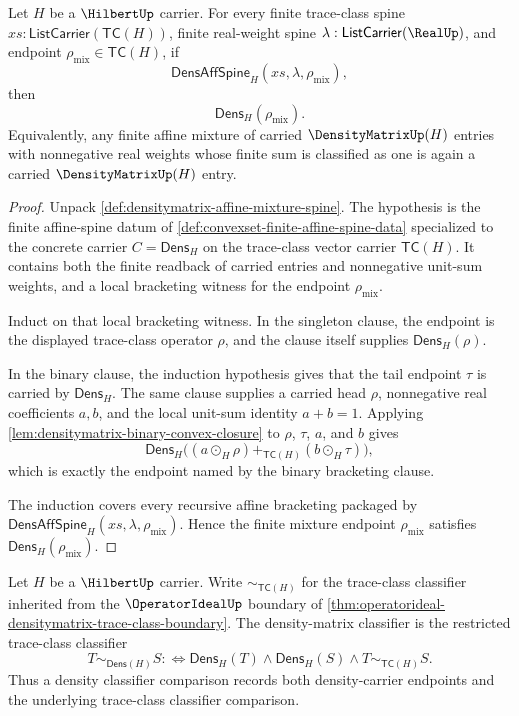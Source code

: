 \begin{theorem}
\label{thm:densitymatrix-finite-affine-mixture-closure}
Let $H$ be a $\HilbertUp$ carrier. For every finite trace-class spine $xs:\mathsf{ListCarrier}(\mathsf{TC}(H))$, finite real-weight spine $\lambda:\mathsf{ListCarrier}(\RealUp)$, and endpoint $\rho_{\mathrm{mix}}\in\mathsf{TC}(H)$, if
$$
\mathsf{DensAffSpine}_H(xs,\lambda,\rho_{\mathrm{mix}}),
$$
then
$$
\mathsf{Dens}_H(\rho_{\mathrm{mix}}).
$$
Equivalently, any finite affine mixture of carried $\DensityMatrixUp(H)$ entries with nonnegative real weights whose finite sum is classified as one is again a carried $\DensityMatrixUp(H)$ entry.
\end{theorem}
\begin{proof}
Unpack \autoref{def:densitymatrix-affine-mixture-spine}. The hypothesis is the finite affine-spine datum of \autoref{def:convexset-finite-affine-spine-data} specialized to the concrete carrier $C=\mathsf{Dens}_H$ on the trace-class vector carrier $\mathsf{TC}(H)$. It contains both the finite readback of carried entries and nonnegative unit-sum weights, and a local bracketing witness for the endpoint $\rho_{\mathrm{mix}}$.

Induct on that local bracketing witness. In the singleton clause, the endpoint is the displayed trace-class operator $\rho$, and the clause itself supplies $\mathsf{Dens}_H(\rho)$.

In the binary clause, the induction hypothesis gives that the tail endpoint $\tau$ is carried by $\mathsf{Dens}_H$. The same clause supplies a carried head $\rho$, nonnegative real coefficients $a,b$, and the local unit-sum identity $a+b=1$. Applying \autoref{lem:densitymatrix-binary-convex-closure} to $\rho$, $\tau$, $a$, and $b$ gives
$$
\mathsf{Dens}_H\bigl((a\odot_H\rho)+_{\mathsf{TC}(H)}(b\odot_H\tau)\bigr),
$$
which is exactly the endpoint named by the binary bracketing clause.

The induction covers every recursive affine bracketing packaged by $\mathsf{DensAffSpine}_H(xs,\lambda,\rho_{\mathrm{mix}})$. Hence the finite mixture endpoint $\rho_{\mathrm{mix}}$ satisfies $\mathsf{Dens}_H(\rho_{\mathrm{mix}})$.
\end{proof}

\begin{definition}
\label{def:densitymatrix-restricted-classifier}
Let $H$ be a $\HilbertUp$ carrier. Write $\sim_{\mathsf{TC}(H)}$ for the trace-class classifier inherited from the $\OperatorIdealUp$ boundary of \autoref{thm:operatorideal-densitymatrix-trace-class-boundary}. The density-matrix classifier is the restricted trace-class classifier
$$
T\sim_{\mathsf{Dens}(H)}S
:\Longleftrightarrow
\mathsf{Dens}_H(T)\land\mathsf{Dens}_H(S)\land
T\sim_{\mathsf{TC}(H)}S.
$$
Thus a density classifier comparison records both density-carrier endpoints and the underlying trace-class classifier comparison.
\end{definition}

